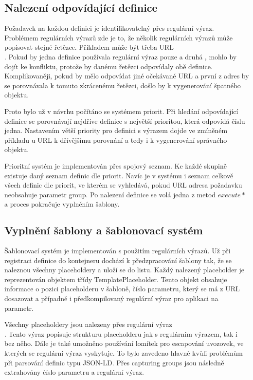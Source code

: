 \documentclass[thesis=B,czech]{FITthesis}[2012/06/26]
\begin{document}
  \subsection{Nalezení odpovídající definice}\label{find_def}
  Požadavek na každou definici je identifikovatelný přes regulární výraz. Problémem regulárních výrazů zde je to, že několik regulárních výrazů může popisovat
  stejné řetězce. Příkladem může být třeba URL \\ . Pokud by jedna definice používala regulární výraz pouze  a druhá , mohlo
  by dojít ke konfliktu, protože by danému řetězci odpovídaly obě definice. Komplikovaněji, pokud by  mělo odpovídat jiné očekávané URL
   a první z adres by se porovnávala k tomuto zkrácenému řetězci, došlo by k vygenerování špatného objektu.
  
  Proto bylo už v návrhu počítáno se systémem priorit. Při hledání odpovídající definice se porovnávají nejdříve definice s největší prioritou, která odpovídá číslu jedna.
  Nastavením větší priority pro definici s výrazem  dojde ve zmíněném příkladu u URL  k dřívějšímu porovnání a tedy i 
  k vygenerování správného objektu.
  
  Prioritní systém je implementován přes spojový seznam. Ke každé skupině existuje daný seznam definic dle priorit. Navíc je v systému i seznam celkově všech
  definic dle priorit, ve kterém se vyhledává, pokud URL adresa požadavku neobsahuje parametr group. Po nalezení definice se volá jedna z metod $execute*$ a 
  proces pokračuje vyplněním šablony.
  
  \subsection{Vyplnění šablony a šablonovací systém}
  Šablonovací systém je implementován s použitím regulárních výrazů. Už při registraci definice do kontejneru dochází k předzpracování šablony tak, že se naleznou
  všechny placeholdery a uloží se do listu. Každý nalezený placeholder je reprezentován objektem třídy TemplatePlaceholder. Tento objekt obsahuje informace o pozici
  placeholderu v šabloně, číslo parametru, který se má z URL dosazovat a případně i předkompilovaný regulární výraz pro aplikaci na parametr. 
  
  Všechny placeholdery jsou nalezeny přes regulární výraz \\
  . Tento výraz popisuje strukturu placeholderu jak s regulárním výrazem, tak i bez něho. Dále je také umožněno používání lomítek pro escapování uvozovek,
  ve kterých se regulární výraz vyskytuje. To bylo zavedeno hlavně kvůli problémům při parsování definic typu JSON-LD. Přes capturing groups jsou následně extrahovány
  číslo parametru a regulární výraz.
  
\end{document}
